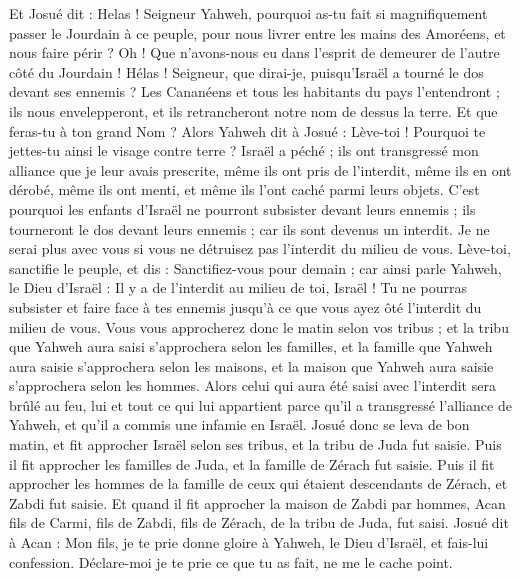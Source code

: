 \begin{multicols}{2}
Et Josué dit : Helas ! Seigneur Yahweh, pourquoi as-tu fait si magnifiquement passer le Jourdain à ce peuple, pour nous livrer entre les mains des Amoréens, et nous faire périr ? Oh ! Que n'avons-nous eu dans l'esprit de demeurer de l'autre côté du Jourdain !
Hélas ! Seigneur, que dirai-je, puisqu'Israël a tourné le dos devant ses ennemis ?
Les Cananéens et tous les habitants du pays l'entendront ; ils nous envelepperont, et ils retrancheront notre nom de dessus la terre. Et que feras-tu à ton grand Nom ?
Alors Yahweh dit à Josué : Lève-toi ! Pourquoi te jettes-tu ainsi le visage contre terre ?
Israël a péché ; ils ont transgressé mon alliance que je leur avais prescrite, même ils ont pris de l'interdit, même ils en ont dérobé, même ils ont menti, et même ils l'ont caché parmi leurs objets.
C'est pourquoi les enfants d'Israël ne pourront subsister devant leurs ennemis ; ils tourneront le dos devant leurs ennemis ; car ils sont devenus un interdit. Je ne serai plus avec vous si vous ne détruisez pas l'interdit du milieu de vous.
Lève-toi, sanctifie le peuple, et dis : Sanctifiez-vous pour demain ; car ainsi parle Yahweh, le Dieu d'Israël : Il y a de l'interdit au milieu de toi, Israël ! Tu ne pourras subsister et faire face à tes ennemis jusqu'à ce que vous ayez ôté l'interdit du milieu de vous.
Vous vous approcherez donc le matin selon vos tribus ; et la tribu que Yahweh aura saisi s'approchera selon les familles, et la famille que Yahweh aura saisie s'approchera selon les maisons, et la maison que Yahweh aura saisie s'approchera selon les hommes.
Alors celui qui aura été saisi avec l'interdit sera brûlé au feu, lui et tout ce qui lui appartient parce qu'il a transgressé l'alliance de Yahweh, et qu'il a commis une infamie en Israël.
Josué donc se leva de bon matin, et fit approcher Israël selon ses tribus, et la tribu de Juda fut saisie.
Puis il fit approcher les familles de Juda, et la famille de Zérach fut saisie. Puis il fit approcher les hommes de la famille de ceux qui étaient descendants de Zérach, et Zabdi fut saisie.
Et quand il fit approcher la maison de Zabdi par hommes, Acan fils de Carmi, fils de Zabdi, fils de Zérach, de la tribu de Juda, fut saisi.
Josué dit à Acan : Mon fils, je te prie donne gloire à Yahweh, le Dieu d'Israël, et fais-lui confession. Déclare-moi je te prie ce que tu as fait, ne me le cache point.

\end{multicols}
